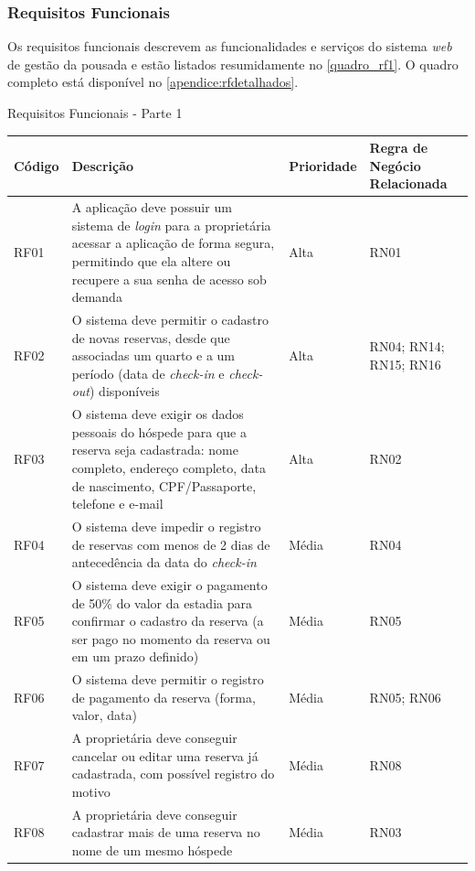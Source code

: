 \documentclass[
	12pt,				%
	openany,			%
	oneside,			%
	a4paper,			%
	english,			%
	french,				%
	spanish,			%
	brazil				%
	]{abntex2}
\begin{document}
\subsubsection{Requisitos Funcionais}
Os requisitos funcionais descrevem as funcionalidades e serviços do sistema \textit{web} de gestão da pousada e estão listados resumidamente no \autoref{quadro_rf1}. O quadro completo está disponível no \autoref{apendice:rfdetalhados}.
%
\begin{quadro}[H]
	\caption{Requisitos Funcionais - Parte 1}
	\label{quadro_rf1}
	\begin{tabular}{|>{\centering\arraybackslash}p{1.5cm}|p{7.2cm}|>{\centering\arraybackslash}p{2cm}|>{\centering\arraybackslash}p{3.5cm}|}
		\hline
		\textbf{Código} & \textbf{Descrição} & \textbf{Prioridade} & \textbf{Regra de Negócio Relacionada} 
		\\ \hline
		RF01 & A aplicação deve possuir um sistema de \textit{login} para a proprietária acessar a aplicação de forma segura, permitindo que ela altere ou recupere a sua senha de acesso sob demanda & Alta & RN01 
		\\ \hline
		RF02 & O sistema deve permitir o cadastro de novas reservas, desde que associadas um quarto e a um período (data de \textit{check-in} e \textit{check-out}) disponíveis & Alta & RN04; RN14; RN15; RN16
		 \\ \hline
		RF03 & O sistema deve exigir os dados pessoais do hóspede para que a reserva seja cadastrada: nome completo, endereço completo, data de nascimento, CPF/Passaporte, telefone e e-mail & Alta & RN02 
		\\ \hline
		RF04& O sistema deve impedir o registro de reservas com menos de 2 dias de antecedência da data do \textit{check-in} & Média & RN04 
		\\ \hline
		RF05 & O sistema deve exigir o pagamento de 50\% do valor da estadia para confirmar o cadastro da reserva (a ser pago no momento da reserva ou em um prazo definido) & Média & RN05 
		\\ \hline
		RF06 & O sistema deve permitir o registro de pagamento da reserva (forma, valor, data) & Média & RN05; RN06
		\\ \hline
		RF07 & A proprietária deve conseguir cancelar ou editar uma reserva já cadastrada, com possível registro do motivo & Média & RN08
		\\ \hline
		RF08 & A proprietária deve conseguir cadastrar mais de uma reserva no nome de um mesmo hóspede & Média & RN03 
		\\ \hline
	\end{tabular}
\end{quadro}
\end{document}
